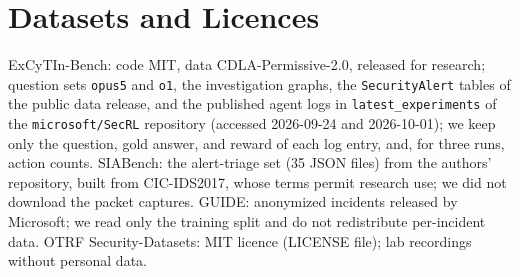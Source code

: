 \section{Datasets and Licences}
\label{app:licences}

ExCyTIn-Bench: code MIT, data CDLA-Permissive-2.0, released for research; question sets \texttt{opus5} and \texttt{o1}, the investigation graphs, the \texttt{SecurityAlert} tables of the public data release, and the published agent logs in \texttt{latest\_experiments} of the \texttt{microsoft/SecRL} repository (accessed 2026-09-24 and 2026-10-01); we keep only the question, gold answer, and reward of each log entry, and, for three runs, action counts. SIABench: the alert-triage set (35 JSON files) from the authors' repository, built from CIC-IDS2017, whose terms permit research use; we did not download the packet captures. GUIDE: anonymized incidents released by Microsoft; we read only the training split and do not redistribute per-incident data. OTRF Security-Datasets: MIT licence (LICENSE file); lab recordings without personal data.
